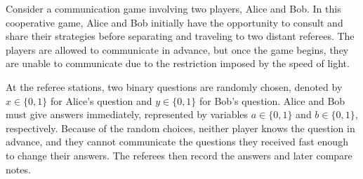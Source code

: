 Consider a communication game involving two players, Alice and Bob. In this cooperative game, Alice and Bob initially have the opportunity to consult and share their strategies before separating and traveling to two distant referees. The players are allowed to communicate in advance, but once the game begins, they are unable to communicate due to the restriction imposed by the speed of light.

\vspace{0.5em}
At the referee stations, two binary questions are randomly chosen, denoted by $x\in\{0,1\}$ for Alice's question and $y\in\{0,1\}$ for Bob's question. Alice and Bob must give answers immediately, represented by variables $a\in\{0,1\}$ and $b\in\{0,1\}$, respectively. Because of the random choices, neither player knows the question in advance, and they cannot communicate the questions they received fast enough to change their answers. The referees then record the answers and later compare notes.

